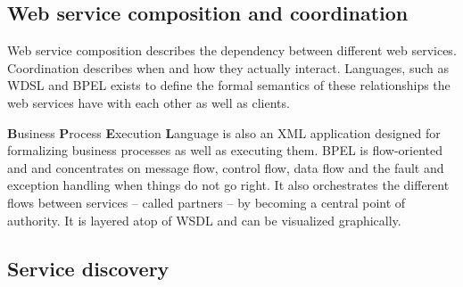 \subsection{Web service composition and coordination}
\kim

\noindent
Web service composition describes the dependency between different web services. Coordination describes when and how they actually interact. Languages, such as WDSL and BPEL exists to define the formal semantics of these relationships the web services have with each other as well as clients.

 \textbf{B}usiness \textbf{P}rocess \textbf{E}xecution \textbf{L}anguage is also an XML application designed for formalizing business processes as well as executing them. BPEL is flow-oriented and and concentrates on message flow, control flow, data flow and the fault and exception handling when things do not go right. It also orchestrates the different flows between services -- called partners -- by becoming a central point of authority. It is layered atop of WSDL and can be visualized graphically.



\subsection{Service discovery}
\pet

